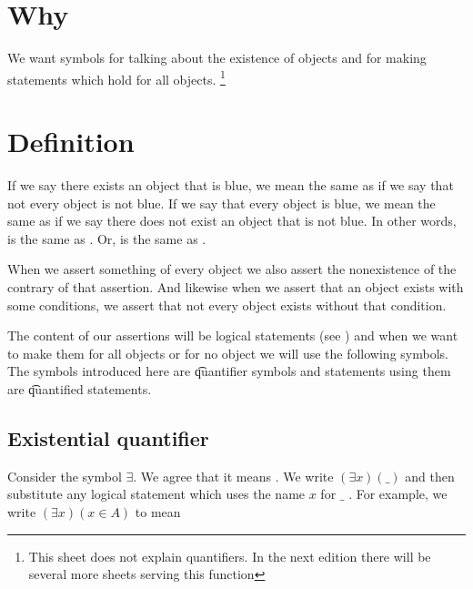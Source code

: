 
\section*{Why}

We want symbols for talking about the existence of objects and for making statements which hold for all objects.
    \ifhmode\unskip\fi\footnote{
This sheet does not explain quantifiers. In the next edition there will be several more sheets serving this function
    }

\section*{Definition}

If we say there exists an object that is blue, we mean the same as if we say that not every object is not blue.
If we say that every object is blue, we mean the same as if we say there does not exist an object that is not blue.
In other words,  is the same as .
Or,  is the same as .

When we assert something of every object we also assert the nonexistence of the contrary of that assertion.
And likewise when we assert that an object exists with some conditions, we assert that not every object exists without that condition.

The content of our assertions will be logical statements (see ) and when we want to make them for all objects or for no object we will use the following symbols.
The symbols introduced here are \t{quantifier symbols} and statements using them are \t{quantified statements}.

\subsection*{Existential quantifier}

Consider the symbol $\exists $.
We agree that it means .
We write $(\exists x)(\_)$ and then substitute any logical statement which uses the name $x$ for $\_$ .
For example, we write $(\exists x)(x \in A)$ to mean 

